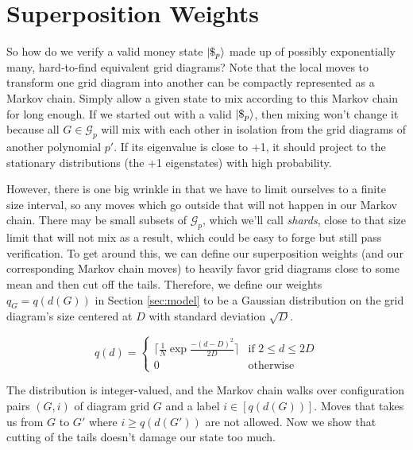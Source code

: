 \section{Superposition Weights}
\label{sec:weights}

So how do we verify a valid money state $|\$_p \rangle$ made up of possibly
exponentially many, hard-to-find
equivalent grid diagrams? Note that
the local moves to transform one grid diagram into another can be
compactly represented as a Markov chain. Simply allow a given state to
mix according to this Markov chain for long enough. If we started
out with a valid $|\$_p \rangle$, then mixing won't change it because
all $G\in\mathcal{G}_p$ will mix with each other in isolation from the
grid diagrams of another polynomial $p'$. If its
eigenvalue is close to +1, it should project to the
stationary distributions (the +1 eigenstates) with high probability.

However, there is one big wrinkle in that we have to limit ourselves
to a finite size interval,
so any moves which go outside that will not happen in our Markov chain.
There may be small subsets of $\mathcal{G}_p$, which we'll call
\emph{shards},
close to that size limit that will
not mix as a result, which could be
easy to forge but still pass verification.
To get around this, we can define our superposition
weights (and our corresponding Markov chain moves) to heavily favor
grid diagrams close to some mean and then
cut off the tails. Therefore,
we define our weights $q_G=q(d(G))$ in Section \ref{sec:model}
to be
a Gaussian distribution on the grid diagram's size 
centered at $D$ with standard deviation
$\sqrt{D}$.

\begin{displaymath}
q(d) = 
\begin{cases} 
\lceil \tfrac{1}{N} \exp \tfrac{-(d-D)^2}{2D} \rceil & \text{if } 2 \le d \le 2D\\ 
0 & \text{otherwise }
\end{cases} 
\end{displaymath}

The distribution is integer-valued, and the Markov chain walks over
configuration pairs $(G,i)$ of diagram grid $G$ and a label
$i \in [q(d(G))]$. Moves that takes us from $G$ to $G'$ where
$i \ge q(d(G'))$ are not allowed.
Now we show that cutting of the tails doesn't damage our state too much.
